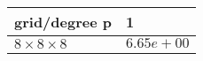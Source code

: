 \begin{tabular}{ll}
\hline
 grid/degree p         & 1          \\
\hline
 $8 \times 8 \times 8$ & $6.65e+00$ \\
\hline
\end{tabular}